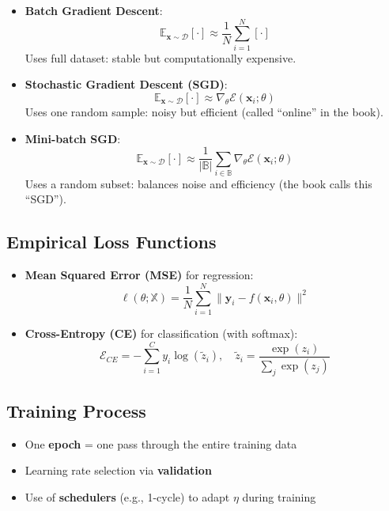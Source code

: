 \begin{notechapter}
\begin{itemize}
    \item \textbf{Batch Gradient Descent}:
    \[
    \mathbb{E}_{\mathbf{x} \sim \mathcal{D}}[\cdot] \approx \frac{1}{N} \sum_{i=1}^N [\cdot]
    \]
    Uses full dataset: stable but computationally expensive.
    
    \item \textbf{Stochastic Gradient Descent (SGD)}:
    \[
    \mathbb{E}_{\mathbf{x} \sim \mathcal{D}}[\cdot] \approx \nabla_\theta \mathcal{E}(\mathbf{x}_i; \theta)
    \]
    Uses one random sample: noisy but efficient (called ``online'' in the book).
    
    \item \textbf{Mini-batch SGD}:
    \[
    \mathbb{E}_{\mathbf{x} \sim \mathcal{D}}[\cdot] \approx \frac{1}{|\mathbb{B}|} \sum_{i \in \mathbb{B}} \nabla_\theta \mathcal{E}(\mathbf{x}_i; \theta)
    \]
    Uses a random subset: balances noise and efficiency (the book calls this ``SGD'').
\end{itemize}

\subsection{Empirical Loss Functions}
\begin{itemize}
    \item \textbf{Mean Squared Error (MSE)} for regression:
    \[
    \ell(\theta; \mathbb{X}) = \frac{1}{N} \sum_{i=1}^N \| \mathbf{y}_i - f(\mathbf{x}_i, \theta) \|^2
    \]
    \item \textbf{Cross-Entropy (CE)} for classification (with softmax):
    \[
    \mathcal{E}_{CE} = -\sum_{i=1}^{C} y_i \log(\tilde{z}_i), \quad \tilde{z}_i = \frac{\exp(z_i)}{\sum_j \exp(z_j)}
    \]
\end{itemize}

\subsection{Training Process}
\begin{itemize}
    \item One \textbf{epoch} = one pass through the entire training data
    \item Learning rate selection via \textbf{validation}
    \item Use of \textbf{schedulers} (e.g., 1-cycle) to adapt $\eta$ during training
\end{itemize}


\end{notechapter}
